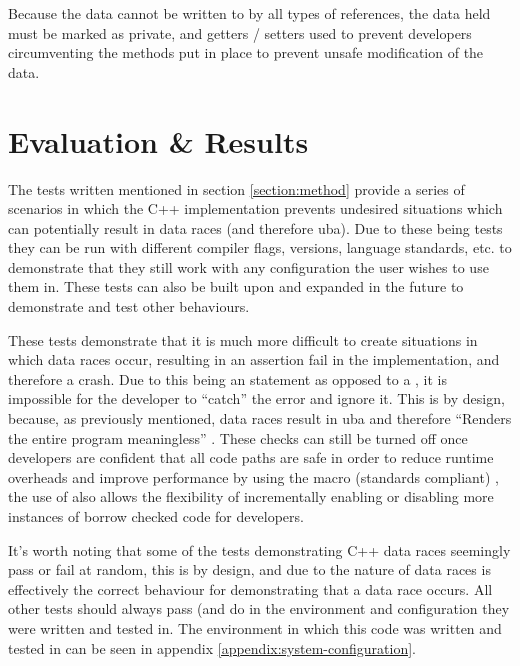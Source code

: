 \documentclass[a4paper]{article}
\begin{document}
Because the data cannot be written to by all types of references, the data held must be marked as private, and getters / setters used to prevent developers circumventing the methods put in place to prevent unsafe modification of the data.

\section{Evaluation \& Results}
The tests written mentioned in section \ref{section:method} provide a series of scenarios in which the C++ implementation prevents undesired situations which can potentially result in data races (and therefore \gls{uba}). Due to these being tests they can be run with different compiler flags, versions, language standards, etc. to demonstrate that they still work with any configuration the user wishes to use them in. These tests can also be built upon and expanded in the future to demonstrate and test other behaviours.

These tests demonstrate that it is much more difficult to create situations in which data races occur, resulting in an assertion fail in the implementation, and therefore a crash. Due to this being an  statement as opposed to a , it is impossible for the developer to ``catch'' the error and ignore it. This is by design, because, as previously mentioned, data races result in \gls{uba} and therefore ``Renders the entire program meaningless'' \parencite{cpp-reference-ub}. These checks can still be turned off once developers are confident that all code paths are safe in order to reduce runtime overheads and improve performance by using the  macro (standards compliant) \parencite{ndebug}, the use of  also allows the flexibility of incrementally enabling or disabling more instances of borrow checked code for developers.

It's worth noting that some of the tests demonstrating C++ data races seemingly pass or fail at random, this is by design, and due to the nature of data races is effectively the correct behaviour for demonstrating that a data race occurs. All other tests should always pass (and do in the environment and configuration they were written and tested in. The environment in which this code was written and tested in can be seen in appendix \ref{appendix:system-configuration}.
\end{document}
